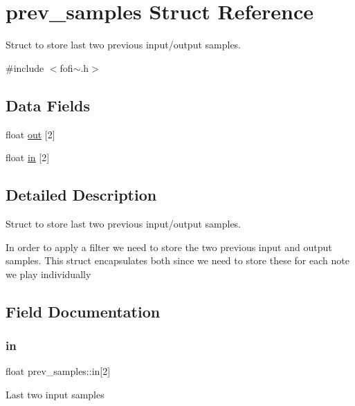 \hypertarget{structprev__samples}{}\section{prev\+\_\+samples Struct Reference}
\label{structprev__samples}


Struct to store last two previous input/output samples.  




{\ttfamily \#include $<$fofi$\sim$.\+h$>$}

\subsection*{Data Fields}
\begin{DoxyCompactItemize}
\item 
float \mbox{\hyperlink{structprev__samples_ababa7affbc9b721599054b932fd3b687}{out}} \mbox{[}2\mbox{]}
\item 
float \mbox{\hyperlink{structprev__samples_a970fccb60b4bd4921159209f991a7820}{in}} \mbox{[}2\mbox{]}
\end{DoxyCompactItemize}


\subsection{Detailed Description}
Struct to store last two previous input/output samples. 

In order to apply a filter we need to store the two previous input and output samples. This struct encapsulates both since we need to store these for each note we play individually 

\subsection{Field Documentation}
\mbox{\label{structprev__samples_a970fccb60b4bd4921159209f991a7820}} 
\subsubsection{\texorpdfstring{in}{in}}
{\footnotesize\ttfamily float prev\+\_\+samples\+::in\mbox{[}2\mbox{]}}

Last two input samples \mbox{\label{structprev__samples_ababa7affbc9b721599054b932fd3b687}} 
